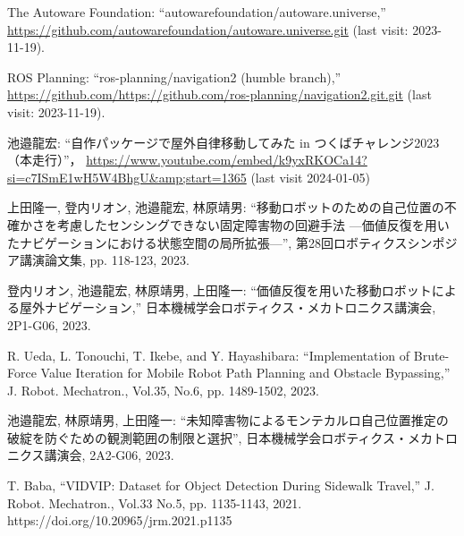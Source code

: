 \documentclass[twocolumn,9pt]{jsproceedings}
\begin{document}
\begin{thebibliography}{99}
  The Autoware Foundation: ``autowarefoundation/autoware.universe,'' \url{https://github.com/autowarefoundation/autoware.universe.git} (last visit: 2023-11-19).

  ROS Planning: ``ros-planning/navigation2 (humble branch),'' \url{https://github.com/https://github.com/ros-planning/navigation2.git.git} (last visit: 2023-11-19).


  池邉龍宏: ``自作パッケージで屋外自律移動してみた in つくばチャレンジ2023（本走行）''，
  \url{https://www.youtube.com/embed/k9yxRKOCa14?si=c7ISmE1wH5W4BhgU&amp;start=1365} (last visit 2024-01-05)

上田隆一, 登内リオン, 池邉龍宏, 林原靖男: ``移動ロボットのための自己位置の不確かさを考慮したセンシングできない固定障害物の回避手法 ---価値反復を用いたナビゲーションにおける状態空間の局所拡張---'', 第28回ロボティクスシンポジア講演論文集, pp. 118-123, 2023.

  登内リオン, 池邉龍宏, 林原靖男, 上田隆一: ``価値反復を用いた移動ロボットによる屋外ナビゲーション,''
  日本機械学会ロボティクス・メカトロニクス講演会, 2P1-G06, 2023.

  R. Ueda, L. Tonouchi, T. Ikebe, and Y. Hayashibara: ``Implementation of Brute-Force Value Iteration for Mobile Robot Path Planning and Obstacle Bypassing,''
  J. Robot. Mechatron., Vol.35, No.6, pp. 1489-1502, 2023.

  池邉龍宏, 林原靖男, 上田隆一: ``未知障害物によるモンテカルロ自己位置推定の破綻を防ぐための観測範囲の制限と選択'',
  日本機械学会ロボティクス・メカトロニクス講演会, 2A2-G06, 2023.
  
  T. Baba, “VIDVIP: Dataset for Object Detection During Sidewalk Travel,” J. Robot. Mechatron., Vol.33 No.5, pp. 1135-1143, 2021. https://doi.org/10.20965/jrm.2021.p1135
  
\end{thebibliography}
\normalsize

\clearpage

\end{document}
